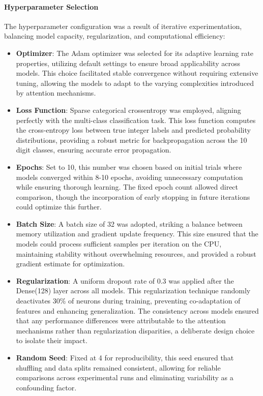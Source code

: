 \documentclass[12pt]{article}
\begin{document}
\paragraph{Hyperparameter Selection}
The hyperparameter configuration was a result of iterative experimentation, balancing model capacity, regularization, and computational efficiency:
\begin{itemize}
    \item \textbf{Optimizer}: The Adam optimizer was selected for its adaptive learning rate properties, utilizing default settings to ensure broad applicability across models. This choice facilitated stable convergence without requiring extensive tuning, allowing the models to adapt to the varying complexities introduced by attention mechanisms.
    \item \textbf{Loss Function}: Sparse categorical crossentropy was employed, aligning perfectly with the multi-class classification task. This loss function computes the cross-entropy loss between true integer labels and predicted probability distributions, providing a robust metric for backpropagation across the 10 digit classes, ensuring accurate error propagation.
    \item \textbf{Epochs}: Set to 10, this number was chosen based on initial trials where models converged within 8-10 epochs, avoiding unnecessary computation while ensuring thorough learning. The fixed epoch count allowed direct comparison, though the incorporation of early stopping in future iterations could optimize this further.
    \item \textbf{Batch Size}: A batch size of 32 was adopted, striking a balance between memory utilization and gradient update frequency. This size ensured that the models could process sufficient samples per iteration on the CPU, maintaining stability without overwhelming resources, and provided a robust gradient estimate for optimization.
    \item \textbf{Regularization}: A uniform dropout rate of 0.3 was applied after the Dense(128) layer across all models. This regularization technique randomly deactivates 30\% of neurons during training, preventing co-adaptation of features and enhancing generalization. The consistency across models ensured that any performance differences were attributable to the attention mechanisms rather than regularization disparities, a deliberate design choice to isolate their impact.
    \item \textbf{Random Seed}: Fixed at 4 for reproducibility, this seed ensured that shuffling and data splits remained consistent, allowing for reliable comparisons across experimental runs and eliminating variability as a confounding factor.
\end{itemize}
\end{document}

